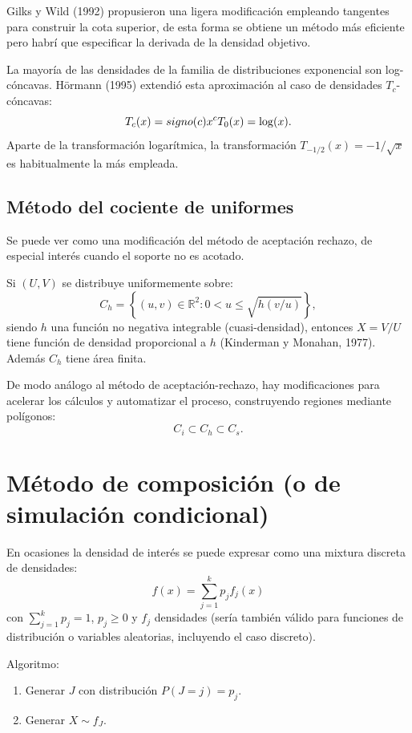 \documentclass[
]{book}
\theoremstyle{break}
\theoremstyle{definition}
\theoremstyle{definition}
\theoremstyle{definition}
\theoremstyle{definition}
\theoremstyle{remark}
\begin{document}
Gilks y Wild (1992) propusieron una ligera modificación empleando tangentes para construir la cota superior, de esta forma se obtiene un método más eficiente pero habrí que especificar la derivada de la densidad objetivo.

La mayoría de las densidades de la familia de distribuciones exponencial son log-cóncavas.
Hörmann (1995) extendió esta aproximación al caso de densidades \(T_{c}\)-cóncavas:
\[T_{c}(x) = signo(c)x^{c} \\
T_{0}(x) = \log (x).\]
Aparte de la transformación logarítmica, la transformación \(T_{-1/2}(x)=-1/\sqrt{x}\) es habitualmente la más empleada.

\hypertarget{muxe9todo-del-cociente-de-uniformes}{%
\subsection{Método del cociente de uniformes}\label{muxe9todo-del-cociente-de-uniformes}}

Se puede ver como una modificación del método de aceptación rechazo,
de especial interés cuando el soporte no es acotado.

Si \((U,V)\) se distribuye uniformemente sobre:
\[C_{h} = \left\{ \left( u,v\right) \in \mathbb{R}^{2} : 
0<u\leq \sqrt{h(v/u)} \right\},\]
siendo \(h\) una función no negativa integrable
(cuasi-densidad), entonces \(X=V/U\) tiene función de densidad
proporcional a \(h\) (Kinderman y Monahan, 1977).
Además \(C_{h}\) tiene área finita.

De modo análogo al método de aceptación-rechazo, hay modificaciones
para acelerar los cálculos y automatizar el proceso, construyendo
regiones mediante polígonos:\[C_{i}\subset C_{h}\subset C_{s}.\]

\hypertarget{composicion}{%
\section{Método de composición (o de simulación condicional)}\label{composicion}}

En ocasiones la densidad de interés se puede expresar como una
mixtura discreta de densidades:
\[f(x)=\sum_{j=1}^{k}p_{j}f_{j}(x)\]
con \(\sum_{j=1}^{k}p_j=1\), \(p_j\geq 0\) y \(f_j\) densidades
(sería también válido para funciones de distribución o variables aleatorias,
incluyendo el caso discreto).

Algoritmo:

\begin{enumerate}
\def\labelenumi{\arabic{enumi}.}
\item
  Generar \(J\) con distribución \(P\left( J=j \right) = p_j\).
\item
  Generar \(X\sim f_J\).
\end{enumerate}
\end{document}
